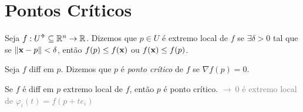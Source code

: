 \section{Pontos Críticos}

\begin{definition}
    Seja \(f:U\ab\subseteq \R^n\to \R\). Dizemos que \(p \in U\) é extremo local de \(f\) se \(\exists \delta >0\) tal que se \(\|\textbf{x}-p\|<\delta\), então \(f(p) \leq f(\textbf{x}) \) ou \(f(\textbf{x}) \leq f(p)\). 
\end{definition}

\begin{definition}
    Seja \(f\) diff em \(p\). Dizemos que \(p\) é \emph{ponto crítico} de \(f\) se \(\nabla f(p)=0\). 
\end{definition}


\begin{proposition}
    Se \(f\) é diff em \(p\) extremo local de \(f\), então \(p\) é ponto crítico. \textcolor{gray}{\(\rightarrow \ 0\) é extremo local de \(\varphi_i(t) = f(p+te_i)\)}
\end{proposition}

